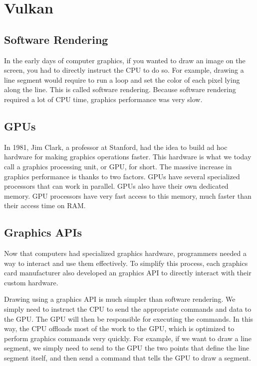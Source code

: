 \chapter{Vulkan}

\section{Software Rendering}

In the early days of computer graphics, if you wanted to draw an image on the
screen, you had to directly instruct the CPU to do so.
For example, drawing a line segment would require to run a loop and set the
color of each pixel lying along the line.
This is called software rendering.
Because software rendering required a lot of CPU time, graphics performance
was very slow.

\section{GPUs}

In 1981, Jim Clark, a professor at Stanford, had the idea to build
ad hoc hardware for making graphics operations faster.
This hardware is what we today call a graphics processing unit, or
GPU, for short.
The massive increase in graphics performance is thanks to two factors.
GPUs have several specialized processors that can work in parallel.
GPUs also have their own dedicated memory.
GPU processors have very fast access to this memory, much faster than
their access time on RAM.

\section{Graphics APIs}

Now that computers had specialized graphics hardware, programmers
needed a way to interact and use them effectively.
To simplify this process, each graphics card manufacturer also developed
an graphics API to directly interact with their custom hardware.

Drawing using a graphics API is much simpler than software rendering.
We simply need to instruct the CPU to send the appropriate commands and data
to the GPU.
The GPU will then be responsible for executing the commands.
In this way, the CPU offloads most of the work to the GPU, which is optimized
to perform graphics commands very quickly.
For example, if we want to draw a line segment, we simply need to send to the
GPU the two points that define the line segment itself, and then send a
command that tells the GPU to draw a segment.

